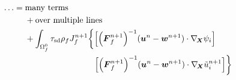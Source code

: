 \documentclass{article}
\newcommand{\bs}[1]{\boldsymbol{#1}}
\newcommand{\Grad}{\nabla_{\!\bs{X}}}
\begin{document}
\begin{equation}
	\begin{aligned}
		\ldots ={} & \text{many terms}                                                        \\
		           & + \text{over multiple lines}                                             \\
		           & + \int_{\Omega_f^0}\tau_\mathrm{sd}\rho_f J_f^{n+1}\biggl\{
		\Bigl[{\Bigl(\bs{F}_f^{n+1}\Bigr)}^{-1}(\bs{u}^n-\bs{w}^{n+1})\cdot\Grad\psi_i\Bigr]
		\\
		           & \hphantom{+ \int_{\Omega_f^0}\tau_\mathrm{sd}\rho_f J_f^{n+1}\biggl\{\ }
		\Bigl[{\Bigl(\bs{F}_f^{n+1}\Bigr)}^{-1}(\bs{u}^n-\bs{w}^{n+1})\cdot\Grad\tilde{u}_i^{n+1}\Bigr]
		\biggr\}
	\end{aligned}
\end{equation}
\end{document}
